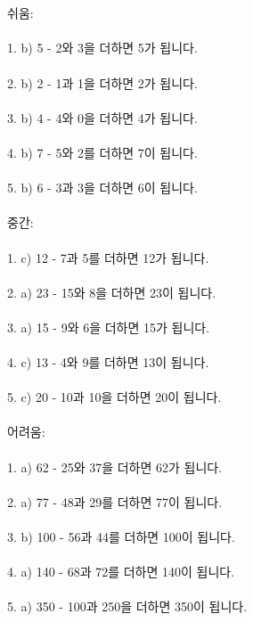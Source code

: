 \documentclass[fleqn]{article}
\begin{document}
      
         \\\\

쉬움: \\\\
1. b) 5 - 2와 3을 더하면 5가 됩니다. \\\\
2. b) 2 - 1과 1을 더하면 2가 됩니다. \\\\
3. b) 4 - 4와 0을 더하면 4가 됩니다. \\\\
4. b) 7 - 5와 2를 더하면 7이 됩니다. \\\\
5. b) 6 - 3과 3을 더하면 6이 됩니다. \\\\
  
중간: \\\\
1. c) 12 - 7과 5를 더하면 12가 됩니다. \\\\
2. a) 23 - 15와 8을 더하면 23이 됩니다. \\\\
3. a) 15 - 9와 6을 더하면 15가 됩니다. \\\\
4. c) 13 - 4와 9를 더하면 13이 됩니다. \\\\
5. c) 20 - 10과 10을 더하면 20이 됩니다. \\\\
  
어려움: \\\\
1. a) 62 - 25와 37을 더하면 62가 됩니다. \\\\
2. a) 77 - 48과 29를 더하면 77이 됩니다. \\\\
3. b) 100 - 56과 44를 더하면 100이 됩니다. \\\\
4. a) 140 - 68과 72를 더하면 140이 됩니다. \\\\
5. a) 350 - 100과 250을 더하면 350이 됩니다. \\\\
      
        
\end{document}

